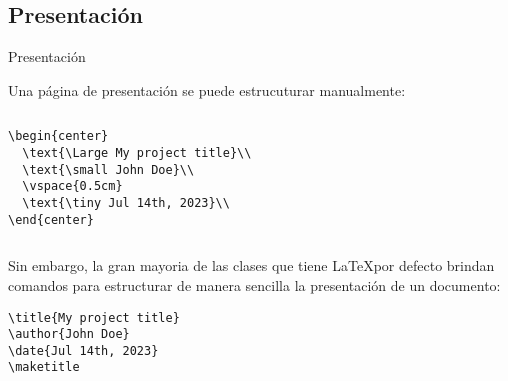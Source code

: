 \subsection{Presentación}
\begin{frame}[fragile]{Presentación}

Una página de presentación se puede estrucuturar manualmente:

\begin{center}
\begin{columns}

\begin{column}{0.5\textwidth}
\begin{lstlisting}[basicstyle=\tiny]
\begin{center}
  \text{\Large My project title}\\
  \text{\small John Doe}\\
  \vspace{0.5cm}
  \text{\tiny Jul 14th, 2023}\\
\end{center}
\end{lstlisting}
\end{column}

\begin{column}{0.5\textwidth}
\begin{center}
  \\
  \\
  \vspace{0.5cm}
  \\
\end{center}
\end{column}

\end{columns}
\end{center}

\pause

Sin embargo, la gran mayoria de las clases que tiene \LaTeX por defecto
brindan comandos para estructurar de manera sencilla la presentación de un
documento:

\begin{lstlisting}[basicstyle=\tiny]
\title{My project title}
\author{John Doe}
\date{Jul 14th, 2023}
\maketitle
\end{lstlisting}

\end{frame}

